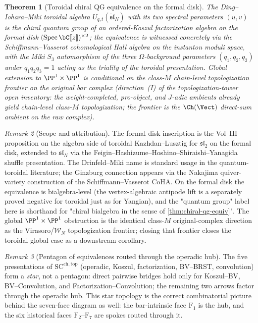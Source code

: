 \documentclass[11pt]{article}
\theoremstyle{plain}
\newtheorem{theorem}{Theorem}[section]
\theoremstyle{definition}
\theoremstyle{remark}
\newtheorem{remark}[theorem]{Remark}
\newcommand{\fsl}{\mathfrak{sl}}
\newcommand{\cW}{\mathcal{W}}
\begin{document}
\begin{theorem}[Toroidal chiral QG equivalence on the formal
disk]\label{thm:chiral-qg-equiv-toroidal-sf}
\ClaimStatusProvedElsewhere
The Ding--Iohara--Miki toroidal algebra $U_{q,t}(\ddot{\fsl}_N)$
with its two spectral parameters $(u,v)$ is the chiral quantum group
of an ordered-Koszul factorization algebra on the formal disk
$(\mathrm{Spec}\,\bC[\![z]\!])^{\times 2}$; the equivalence is
witnessed concretely via the Schiffmann--Vasserot cohomological Hall
algebra on the instanton moduli space, with the Miki $S_3$
automorphism of the three $\Omega$-background parameters
$(q_1,q_2,q_3)$ under $q_1 q_2 q_3 = 1$ acting as the triality of
the toroidal presentation. Global extension to
$\PP^1 \times \PP^1$ is conditional on the class-$M$ chain-level
topologization frontier on the \emph{original} bar complex
(direction~(I) of the topologization-tower open inventory: the
weight-completed, pro-object, and $J$-adic ambients already
yield chain-level class-$M$ topologization; the frontier is the
$\Ch(\Vect)$ direct-sum ambient on the raw complex).
\end{theorem}

\begin{remark}[Scope and attribution]
\label{rem:toroidal-sf-attribution}
The formal-disk inscription is the Vol~III proposition on the algebra
side of toroidal Kazhdan--Lusztig for $\mathfrak{sl}_2$ on the formal
disk, extended to $\fsl_N$ via the
Feigin--Hashizume--Hoshino--Shiraishi--Yanagida shuffle
presentation. The Drinfeld--Miki name is standard usage in the
quantum-toroidal literature; the Ginzburg connection appears via
the Nakajima quiver-variety construction of the Schiffmann--Vasserot
CoHA. On the formal disk the equivalence is bialgebra-level
	(the vertex-algebraic antipode lift is a separately proved
	negative for toroidal just as for Yangian), and the "quantum group"
label here is shorthand for "chiral bialgebra in the sense of
\textup{\ref{thm:chiral-qg-equiv}}". The global
$\PP^1 \times \PP^1$ obstruction is the identical class-$M$
original-complex direction as the Virasoro/$\cW_N$ topologization
frontier; closing that frontier closes the toroidal global case as
a downstream corollary.
\end{remark}

\begin{remark}[Pentagon of equivalences routed through the operadic
hub]\label{rem:pentagon-sf}
The five presentations of $\mathrm{SC}^{\mathrm{ch,top}}$ (operadic,
Koszul, factorization, BV--BRST, convolution) form a
\emph{star}, not a pentagon: direct pairwise bridges hold only for
Koszul--BV, BV--Convolution, and Factorization--Convolution; the
remaining two arrows factor through the operadic hub. This
star topology is the correct combinatorial picture behind the
seven-face diagram as well: the bar-intrinsic face $\mathrm{F}_1$ is
the hub, and the six historical faces $\mathrm{F}_2$--$\mathrm{F}_7$
are spokes routed through it.
\end{remark}
\end{document}
